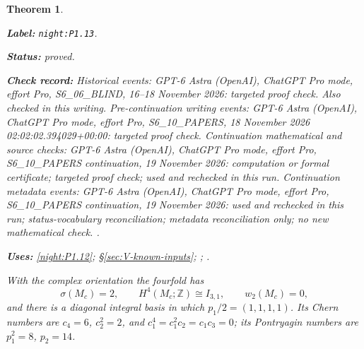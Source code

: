 \documentclass[11pt,a4paper]{article}
\newtheorem{theorem}{Theorem}[section]
\theoremstyle{definition}
\newcommand{\StatementRecord}[4]{\par\smallskip\begingroup\upshape\raggedright\noindent\textbf{Label:} \nolinkurl{#1}.\par\noindent\textbf{Status:} #2.\par\noindent\textbf{Check record:} #3.\par\noindent\textbf{Uses:} #4.\par\endgroup\smallskip}
\begin{document}
\begin{theorem}\label{night:P1.13}
\StatementRecord{night:P1.13}{proved}{Historical events: GPT-6 Astra (OpenAI), ChatGPT Pro mode, effort Pro, S6\_06\_BLIND, 16--18 November 2026: targeted proof check. Also checked in this writing. Pre-continuation writing events: GPT-6 Astra (OpenAI), ChatGPT Pro mode, effort Pro, S6\_10\_PAPERS, 18 November 2026 02:02:02.394029+00:00: targeted proof check. Continuation mathematical and source checks: GPT-6 Astra (OpenAI), ChatGPT Pro mode, effort Pro, S6\_10\_PAPERS continuation, 19 November 2026: computation or formal certificate; targeted proof check; used and rechecked in this run. Continuation metadata events: GPT-6 Astra (OpenAI), ChatGPT Pro mode, effort Pro, S6\_10\_PAPERS continuation, 19 November 2026: used and rechecked in this run; status-vocabulary reconciliation; metadata reconciliation only; no new mathematical check. }{\cref{night:P1.12}; \S\ref{sec:V-known-inputs}; \cite[equations (1.2)--(1.4), pp.~3--4]{ffEsoleKang}; \cite[Theorem 2.2.1, p.~61]{ffPetersSterk}}
With the complex orientation the fourfold has
\[
\sigma(M_c)=2,\qquad H^4(M_c;\mathbb Z)\cong I_{3,1},\qquad
w_2(M_c)=0,
\]
and there is a diagonal integral basis in which
$p_1/2=(1,1,1,1)$.
Its Chern numbers are
$c_4=6$, $c_2^2=2$, and
$c_1^4=c_1^2c_2=c_1c_3=0$; its Pontryagin numbers are
$p_1^2=8$, $p_2=14$.
\end{theorem}
\end{document}
